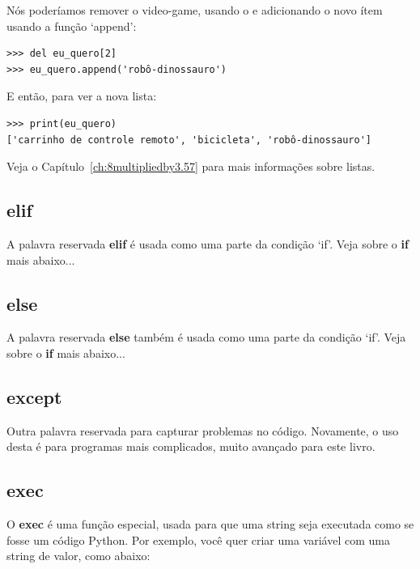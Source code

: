 \noindent
Nós poderíamos remover o video-game, usando o  e adicionando o novo ítem usando a função `append':

\begin{listing}
\begin{verbatim}
>>> del eu_quero[2]
>>> eu_quero.append('robô-dinossauro')
\end{verbatim}
\end{listing}

\noindent
E então, para ver a nova lista:

\begin{listing}
\begin{verbatim}
>>> print(eu_quero)
['carrinho de controle remoto', 'bicicleta', 'robô-dinossauro']
\end{verbatim}
\end{listing}

\noindent
Veja o Capítulo~\ref{ch:8multipliedby3.57} para mais informações sobre listas.

\subsection*{elif}

A palavra reservada \textbf{elif} é usada como uma parte da condição `if'. Veja sobre o \textbf{if} mais abaixo...

\subsection*{else}

A palavra reservada \textbf{else} também é usada como uma parte da condição `if'. Veja sobre o \textbf{if} mais abaixo...

\subsection*{except}

Outra palavra reservada para capturar problemas no código. Novamente, o uso desta é para programas mais complicados, muito avançado para este livro.

\subsection*{exec}

O \textbf{exec} é uma função especial, usada para que uma string seja executada como se fosse um código Python. Por exemplo, você quer criar uma variável com uma string de valor, como abaixo:

